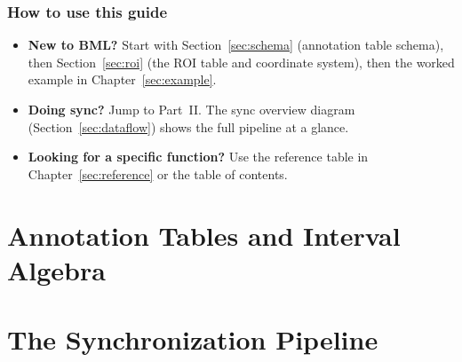 \documentclass[11pt, a4paper]{report}
\begin{document}
\section*{How to use this guide}

\begin{itemize}
  \item \textbf{New to BML?} Start with Section~\ref{sec:schema} (annotation table schema), then Section~\ref{sec:roi} (the ROI table and coordinate system), then the worked example in Chapter~\ref{sec:example}.
  \item \textbf{Doing sync?} Jump to Part~II. The sync overview diagram (Section~\ref{sec:dataflow}) shows the full pipeline at a glance.
  \item \textbf{Looking for a specific function?} Use the reference table in Chapter~\ref{sec:reference} or the table of contents.
\end{itemize}

\tableofcontents
\newpage

\part{Annotation Tables and Interval Algebra}



\part{The Synchronization Pipeline}


\end{document}
